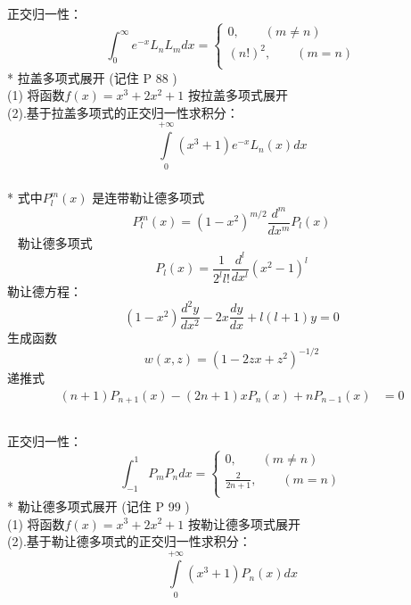 \begin{frame}
    \frametitle{}
    正交归一性：
    \begin{equation*}
        \int_{0}^{\infty}  e^{-x} L_n L_m dx  =
        \begin{cases}
         0, \qquad (m \not =n) \\ 
         (n!)^2 , \qquad (m =n ) \\ 
        \end{cases} 
    \end{equation*}  
    * 拉盖多项式展开 (记住 P 88 ) \\ \vspace*{0.6em}
    (1) 将函数$f(x)=x^3+2x^2 +1$ 按拉盖多项式展开 \\
    (2).基于拉盖多项式的正交归一性求积分：
  \[ \int\limits_{0}^{+\infty} (x^3 +1)e^{-x} L_n(x) d x \]
\end{frame}

\begin{frame}
    \frametitle{}
    * 式中$P^{m} _l (x)$ 是连带勒让德多项式  
	\begin{equation*}
		P^m  _{l}(x)= (1-x^2) ^ {m/2 } \frac{d^{m}}{d x^{m} } P_l(x)
	\end{equation*}	 
    勒让德多项式
	\begin{equation*}
		P_{l}(x)=\frac{1}{2^{l} l !} \frac{d^{l}}{d x^{l}}\left(x^{2}-1\right)^{l}
	\end{equation*}
	勒让德方程：
	\begin{equation*}
		\left(1-x^{2}\right) \frac{d^{2} y}{d x^{2}}-2 x \frac{d y}{d x}+l(l+1)y=0
	\end{equation*}	
    生成函数
	\begin{equation*}
		w(x, z)=\left(1-2 z x+z^{2}\right)^{-1 / 2}
	\end{equation*}	
    递推式
	\begin{equation*}
	\begin{split}
		(n+1) P_{n+1}(x)-(2 n+1) x P_{n}(x)+n P_{n-1}(x) &=0 \\
	\end{split}		
	\end{equation*}	
\end{frame}

\begin{frame}
    \frametitle{}
    正交归一性：
    \begin{equation*}
        \int_{-1}^{1} P_mP_n dx  =
        \begin{cases}
         0, \qquad (m \not =n) \\ 
         \frac{2}{2n+1} , \qquad (m =n ) \\ 
        \end{cases} 
    \end{equation*}  
    * 勒让德多项式展开 (记住 P 99 ) \\ \vspace*{0.6em}
    (1) 将函数$f(x)=x^3+2x^2 +1$ 按勒让德多项式展开 \\
    (2).基于勒让德多项式的正交归一性求积分：
  \[ \int\limits_{0}^{+\infty} (x^3 +1)P_n(x) d x \]
\end{frame}


